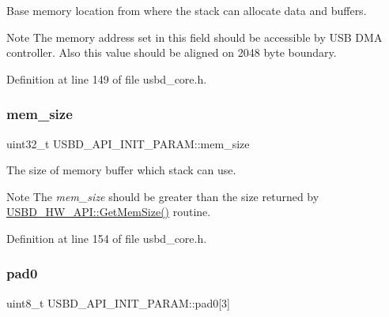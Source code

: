 Base memory location from where the stack can allocate data and buffers. \begin{DoxyNote}{Note}
The memory address set in this field should be accessible by U\+SB D\+MA controller. Also this value should be aligned on 2048 byte boundary. 
\end{DoxyNote}


Definition at line 149 of file usbd\+\_\+core.\+h.

\mbox{\label{struct_u_s_b_d___a_p_i___i_n_i_t___p_a_r_a_m_a237d34b2303d35b80c7ebb9c58326bf9}} 
\subsubsection{\texorpdfstring{mem\+\_\+size}{mem\_size}}
{\footnotesize\ttfamily uint32\+\_\+t U\+S\+B\+D\+\_\+\+A\+P\+I\+\_\+\+I\+N\+I\+T\+\_\+\+P\+A\+R\+A\+M\+::mem\+\_\+size}

The size of memory buffer which stack can use. \begin{DoxyNote}{Note}
The {\itshape mem\+\_\+size} should be greater than the size returned by \hyperlink{struct_u_s_b_d___h_w___a_p_i_a59a65bd037723d735b684c308d99fc54}{U\+S\+B\+D\+\_\+\+H\+W\+\_\+\+A\+P\+I\+::\+Get\+Mem\+Size()} routine. 
\end{DoxyNote}


Definition at line 154 of file usbd\+\_\+core.\+h.

\mbox{\label{struct_u_s_b_d___a_p_i___i_n_i_t___p_a_r_a_m_ab537ed0a84e63aaf79592e8bd500c79c}} 
\subsubsection{\texorpdfstring{pad0}{pad0}}
{\footnotesize\ttfamily uint8\+\_\+t U\+S\+B\+D\+\_\+\+A\+P\+I\+\_\+\+I\+N\+I\+T\+\_\+\+P\+A\+R\+A\+M\+::pad0\mbox{[}3\mbox{]}}



